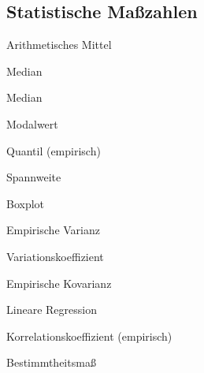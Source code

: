 \subsection{Statistische Maßzahlen}

\begin{defi}{Arithmetisches Mittel}

\end{defi}

\begin{defi}{Median}

\end{defi}

\begin{defi}{Median}

\end{defi}

\begin{defi}{Modalwert}

\end{defi}

\begin{defi}{Quantil (empirisch)}

\end{defi}

\begin{defi}{Spannweite}

\end{defi}

\begin{defi}{Boxplot}

\end{defi}

\begin{defi}{Empirische Varianz}

\end{defi}

\begin{defi}{Variationskoeffizient}

\end{defi}

\begin{defi}{Empirische Kovarianz}

\end{defi}

\begin{algo}{Lineare Regression}

\end{algo}

\begin{defi}{Korrelationskoeffizient (empirisch)}

\end{defi}

\begin{defi}{Bestimmtheitsmaß}

\end{defi}